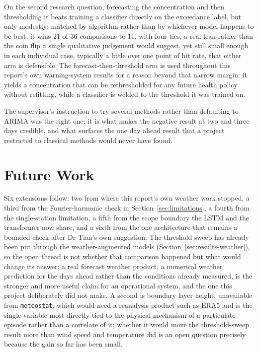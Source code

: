 \documentclass[12pt,a4paper]{report}
\begin{document}
On the second research question, forecasting the concentration and then
thresholding it beats training a classifier directly on the exceedance
label, but only modestly: matched by algorithm rather than by whichever
model happens to be best, it wins 21 of 36 comparisons to 11, with four
ties, a real lean rather than the coin flip a single qualitative judgement
would suggest, yet still small enough in each individual case, typically a
little over one point of hit rate, that either arm is defensible. The forecast-then-threshold
arm is used throughout this report's own warning-system results for a
reason beyond that narrow margin: it yields a concentration that can be
rethresholded for any future health policy without refitting, while a
classifier is welded to the threshold it was trained on.

The
supervisor's instruction to try several methods rather
than defaulting to ARIMA was the right one: it is what makes the negative
result at two and three days credible, and what surfaces the one day ahead
result that a project restricted to classical methods would never have found.

\section{Future Work}
\label{sec:future}

Six extensions follow: two from where this report's own weather work
stopped, a third from the Fourier-harmonic check in
Section~\ref{sec:limitations}, a fourth from the single-station
limitation, a fifth from the scope boundary the LSTM and the transformer
now share, and a sixth from the one architecture that remains a bounded
check after Dr Tian's own suggestion.
The threshold sweep has already been put through the weather-augmented
models (Section~\ref{sec:results-weather}), so the open thread is not
whether that comparison happened but what would change its answer: a real
forecast weather product, a numerical weather prediction for the days ahead
rather than the conditions already measured, is the stronger and more
useful claim for an operational system, and the one this project
deliberately did not make. A second is boundary layer height, unavailable
from \texttt{meteostat}, which would need a reanalysis product such as ERA5
and is the single variable most directly tied to the physical mechanism of
a particulate episode rather than a correlate of it; whether it would move
the threshold-sweep result more than wind speed and temperature did is an
open question precisely because the gain so far has been small.
\end{document}
